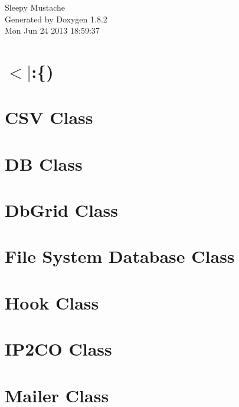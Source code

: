 \documentclass{book}
\begin{document}
\hypersetup{pageanchor=false,citecolor=blue}
\begin{titlepage}
\vspace*{7cm}
\begin{center}
{\Large Sleepy Mustache }\\
\vspace*{1cm}
{\large Generated by Doxygen 1.8.2}\\
\vspace*{0.5cm}
{\small Mon Jun 24 2013 18:59:37}\\
\end{center}
\end{titlepage}
\clearemptydoublepage
{}
\tableofcontents
\clearemptydoublepage
{}
\hypersetup{pageanchor=true,citecolor=blue}
\chapter{$<$$|$\-:\{)}
\label{index}\hypertarget{index}{}
\chapter{C\-S\-V Class}
\label{csv1}
\hypertarget{csv1}{}

\chapter{D\-B Class}
\label{db1}
\hypertarget{db1}{}

\chapter{Db\-Grid Class}
\label{dbgrid1}
\hypertarget{dbgrid1}{}

\chapter{File System Database Class}
\label{fsdb}
\hypertarget{fsdb}{}

\chapter{Hook Class}
\label{hooks1}
\hypertarget{hooks1}{}

\chapter{I\-P2\-C\-O Class}
\label{ip2country}
\hypertarget{ip2country}{}

\chapter{Mailer Class}
\label{mailer1}
\hypertarget{mailer1}{}

\end{document}
